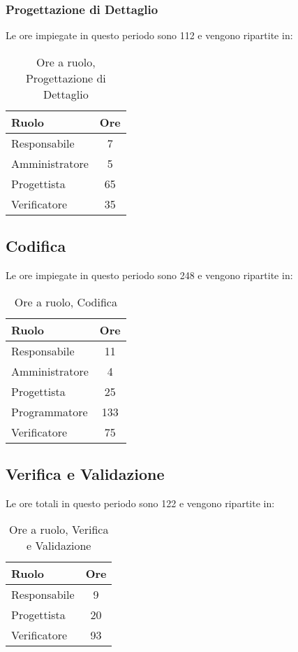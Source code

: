 \subsubsection{Progettazione di Dettaglio}
Le ore impiegate in questo periodo sono 112 e vengono ripartite in:
\begin{table}[H]
	\begin{center}
		\begin{tabular}{|l|c|}
			\hline
			\textbf{Ruolo}	& \textbf{Ore} \\
			\hline
			Responsabile	&	7	\\
			\hline
			Amministratore	&	5	\\
			\hline
			Progettista		&	65	\\
			\hline
			Verificatore	&	35	\\
			\hline
		\end{tabular}
	\end{center}
	\caption{Ore a ruolo, Progettazione di Dettaglio}
\end{table}
\subsection{Codifica}
Le ore impiegate in questo periodo sono 248 e vengono ripartite in:
\begin{table}[H]
	\begin{center}
		\begin{tabular}{|l|c|}
			\hline
			\textbf{Ruolo}	& \textbf{Ore} \\
			\hline
			Responsabile	&	11	\\
			\hline
			Amministratore	&	4	\\
			\hline
			Progettista		&	25	\\
			\hline
			Programmatore	&	133	\\
			\hline
			Verificatore	&	75	\\
			\hline
		\end{tabular}
	\end{center}
	\caption{Ore a ruolo, Codifica}
\end{table}
\subsection{Verifica e Validazione}
Le ore totali in questo periodo sono 122 e vengono ripartite in:
\begin{table}[H]
	\begin{center}
		\begin{tabular}{|l|c|}
			\hline
			\textbf{Ruolo}	& \textbf{Ore} \\
			\hline
			Responsabile	&	9	\\
			\hline
			Progettista		&	20	\\
			\hline
			Verificatore	&	93	\\
			\hline
		\end{tabular}
	\end{center}
	\caption{Ore a ruolo, Verifica e Validazione}
\end{table}
